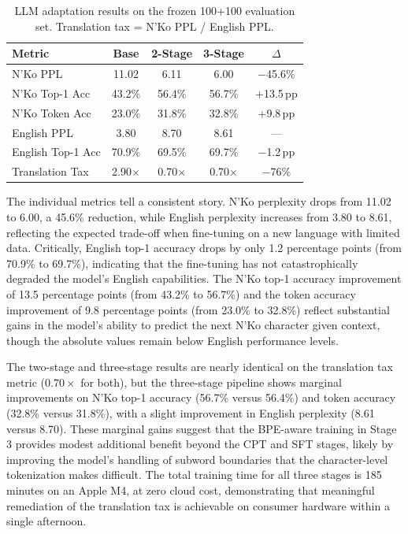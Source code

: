 \documentclass[11pt]{article}
\newcommand{\nko}{N'Ko}
\begin{document}
\begin{table}[t]
\centering
\small
\caption{LLM adaptation results on the frozen 100+100 evaluation set. Translation tax = \nko{} PPL / English PPL.}
\label{tab:adaptation}
\begin{tabular}{@{}lcccc@{}}
\toprule
Metric & Base & 2-Stage & 3-Stage & $\Delta$ \\
\midrule
\nko{} PPL & 11.02 & 6.11 & 6.00 & $-$45.6\% \\
\nko{} Top-1 Acc & 43.2\% & 56.4\% & 56.7\% & +13.5\,pp \\
\nko{} Token Acc & 23.0\% & 31.8\% & 32.8\% & +9.8\,pp \\
English PPL & 3.80 & 8.70 & 8.61 & --- \\
English Top-1 Acc & 70.9\% & 69.5\% & 69.7\% & $-$1.2\,pp \\
Translation Tax & 2.90$\times$ & 0.70$\times$ & 0.70$\times$ & $-$76\% \\
\bottomrule
\end{tabular}
\end{table}

The individual metrics tell a consistent story. \nko{} perplexity drops from 11.02 to 6.00, a 45.6\% reduction, while English perplexity increases from 3.80 to 8.61, reflecting the expected trade-off when fine-tuning on a new language with limited data. Critically, English top-1 accuracy drops by only 1.2 percentage points (from 70.9\% to 69.7\%), indicating that the fine-tuning has not catastrophically degraded the model's English capabilities. The \nko{} top-1 accuracy improvement of 13.5 percentage points (from 43.2\% to 56.7\%) and the token accuracy improvement of 9.8 percentage points (from 23.0\% to 32.8\%) reflect substantial gains in the model's ability to predict the next \nko{} character given context, though the absolute values remain below English performance levels.

The two-stage and three-stage results are nearly identical on the translation tax metric ($0.70\times$ for both), but the three-stage pipeline shows marginal improvements on \nko{} top-1 accuracy (56.7\% versus 56.4\%) and token accuracy (32.8\% versus 31.8\%), with a slight improvement in English perplexity (8.61 versus 8.70). These marginal gains suggest that the BPE-aware training in Stage 3 provides modest additional benefit beyond the CPT and SFT stages, likely by improving the model's handling of subword boundaries that the character-level tokenization makes difficult. The total training time for all three stages is 185 minutes on an Apple M4, at zero cloud cost, demonstrating that meaningful remediation of the translation tax is achievable on consumer hardware within a single afternoon.
\end{document}
